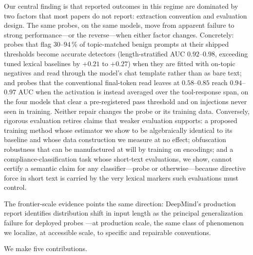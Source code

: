 Our central finding is that reported outcomes in this regime are dominated by two factors that most papers do not
report: extraction convention and evaluation design. The same probes, on the same models, move from apparent failure
to strong performance---or the reverse---when either factor changes. Concretely: probes that flag $30$--$94\,\%$ of
topic-matched benign prompts at their shipped thresholds become accurate detectors (length-stratified AUC $0.92$--$0.98$, exceeding tuned lexical
baselines by $+0.21$ to $+0.27$) when they are fitted with on-topic negatives and read through the model's chat
template rather than as bare text; and
probes that the conventional final-token read leaves at $0.58$--$0.85$ reach $0.94$--$0.97$ AUC when the activation is
instead averaged over the tool-response span, on the four models that clear a pre-registered pass threshold and on
injections never seen in training.
Neither repair changes the probe or its training data. Conversely, rigorous evaluation retires claims that weaker
evaluation supports: a proposed training method whose estimator we show to be algebraically identical to its baseline
and whose data construction we measure at no effect;
obfuscation robustness that can be manufactured at will by training on encodings; and a compliance-classification task
whose short-text evaluations, we show, cannot certify a semantic claim for any classifier---probe or
otherwise---because directive force in short text is carried by the very lexical markers such evaluations must
control.

The frontier-scale evidence points the same direction: DeepMind's production report identifies distribution shift in
input length as the principal generalization failure for deployed probes \cite{gdm2026probes}---at production scale,
the same class of phenomenon we localize, at accessible scale, to specific and repairable conventions.

We make five contributions.

